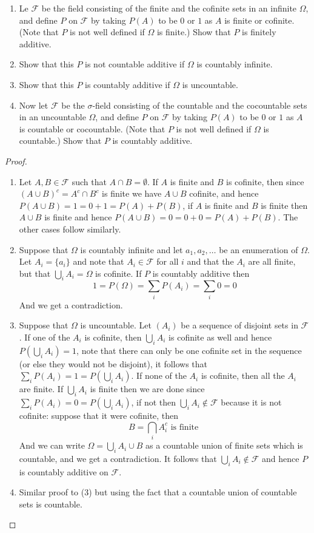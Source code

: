 \documentclass[11pt]{article}
\newcommand{\F}{\mathcal{F}}
\newcommand{\Om}{\Omega}
\newcommand{\es}{\emptyset}
\newcommand{\un}{\cup}
\newcommand{\ic}{\cap}
\newenvironment{exercise}[2][Exercise]{\begin{trivlist}
\item[\hskip \labelsep {\bfseries #1}\hskip \labelsep {\bfseries #2.}]}{\end{trivlist}}
\begin{document}
\begin{exercise}{2.13}
    \begin{enumerate}
        \item Le $\F$ be the field consisting of the finite and the cofinite sets in an infinite $\Om$, and define $P$ on $\F$ by taking $P(A)$ to be $0$ or $1$ as $A$ is finite or cofinite. (Note that $P$ is not well defined if $\Om$ is finite.) Show that $P$ is finitely additive.
        \item Show that this $P$ is not countable additive if $\Om$ is countably infinite.
        \item Show that this $P$ is countably additive if $\Om$ is uncountable.
        \item Now let $\F$ be the $\sigma$-field consisting of the countable and the cocountable sets in an uncountable $\Om$, and define $P$ on $\F$ by taking $P(A)$ to be $0$ or $1$ as $A$ is countable or cocountable. (Note that $P$ is not well defined if $\Om$ is countable.) Show that $P$ is countably additive.
    \end{enumerate}
\end{exercise}
\begin{proof}
    \begin{enumerate}
        \item Let $A, B \in \F$ such that $A \ic B = \es$. If $A$ is finite and $B$ is cofinite, then since $(A \un B)^{c} = A^{c} \ic B^{c}$ is finite we have $A \un B$ cofinite, and hence $P(A \un B) = 1 = 0 + 1 = P(A) + P(B)$, if $A$ is finite and $B$ is finite then $A \un B$ is finite and hence $P(A \un B) = 0 = 0 + 0 = P(A) + P(B)$. The other cases follow similarly.
        \item Suppose that $\Om$ is countably infinite and let $a_1, a_2, \ldots$ be an enumeration of $\Om$. Let $A_{i} = \{ a_i \}$ and note that $A_{i} \in \F$ for all $i$ and that the $A_i$ are all finite, but that $\bigcup_{i} A_i = \Om$ is cofinite. If $P$ is countably additive then
        \[ 1 = P(\Om) = \sum_{i} P(A_i) = \sum_{i} 0 = 0 \]
        And we get a contradiction.
        \item Suppose that $\Om$ is uncountable. Let $(A_i)$ be a sequence of disjoint sets in $\F$. If one of the $A_{i}$ is cofinite, then $\bigcup_i A_i$ is cofinite as well and hence $P(\bigcup_i A_i) = 1$, note that there can only be one cofinite set in the sequence (or else they would not be disjoint), it follows that $\sum_{i} P(A_i) = 1 = P(\bigcup_i A_i)$. If none of the $A_i$ is cofinite, then all the $A_i$ are finite. If $\bigcup_{i} A_{i}$ is finite then we are done since $\sum_i P(A_i) = 0 = P(\bigcup_i A_i)$, if not then $\bigcup_i A_i \notin \F$ because it is not cofinite: suppose that it were cofinite, then
        \[ B = \bigcap_i A_{i}^{c} \text { is finite } \]
        And we can write $\Om = \bigcup_{i} A_i \un B$ as a countable union of finite sets which is countable, and we get a contradiction. It follows that $\bigcup_i A_i \not\in \F$ and hence $P$ is countably additive on $\F$.
        \item Similar proof to (3) but using the fact that a countable union of countable sets is countable.
    \end{enumerate}
\end{proof}
\end{document}
